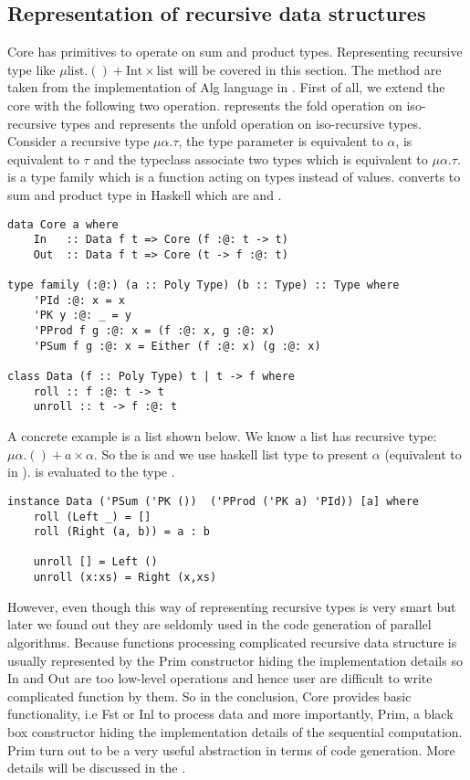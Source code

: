 \subsection{Representation of recursive data structures}
Core has primitives to operate on sum and product types. Representing recursive type like $\mu \text{list}. () + \text{Int} \times \text{list}$ will be covered in this section. The method are taken from the implementation of Alg language in \cite{AlgebraicMultipartyProtocol}. First of all, we extend the core with the following two operation.  represents the fold operation on iso-recursive types and  represents the unfold operation on iso-recursive types. Consider a recursive type $\mu \alpha. \tau$, the type parameter  is equivalent to $\alpha$,  is equivalent to $\tau$ and the typeclass  associate two types which is equivalent to $\mu \alpha. \tau$.  is a type family which is a function acting on types instead of values.  converts  to sum and product type in Haskell which are \hask{(,)} and .
\begin{verbatim}
data Core a where
    In   :: Data f t => Core (f :@: t -> t)
    Out  :: Data f t => Core (t -> f :@: t)

type family (:@:) (a :: Poly Type) (b :: Type) :: Type where
    'PId :@: x = x
    'PK y :@: _ = y
    'PProd f g :@: x = (f :@: x, g :@: x)
    'PSum f g :@: x = Either (f :@: x) (g :@: x)

class Data (f :: Poly Type) t | t -> f where
    roll :: f :@: t -> t
    unroll :: t -> f :@: t
\end{verbatim}
A concrete example is a list shown below. We know a list has recursive type: $\mu \alpha. () + a \times \alpha$. So the  is  and we use haskell list type \hask{[a]} to present $\alpha$ (equivalent to  in  ).  is evaluated to the type .
\begin{verbatim}
instance Data ('PSum ('PK ())  ('PProd ('PK a) 'PId)) [a] where
    roll (Left _) = []
    roll (Right (a, b)) = a : b
  
    unroll [] = Left ()
    unroll (x:xs) = Right (x,xs)
\end{verbatim}

However, even though this way of representing recursive types is very smart but later we found out they are seldomly used in the code generation of parallel algorithms. Because functions processing complicated recursive data structure is usually represented by the Prim constructor hiding the implementation details so In and Out are too low-level operations and hence user are difficult to write complicated function by them. So in the conclusion, Core provides basic functionality, i.e Fst or Inl to process data and more importantly, Prim, a black box constructor hiding the implementation details of the sequential computation. Prim turn out to be a very useful abstraction in terms of code generation. More details will be discussed in the .
